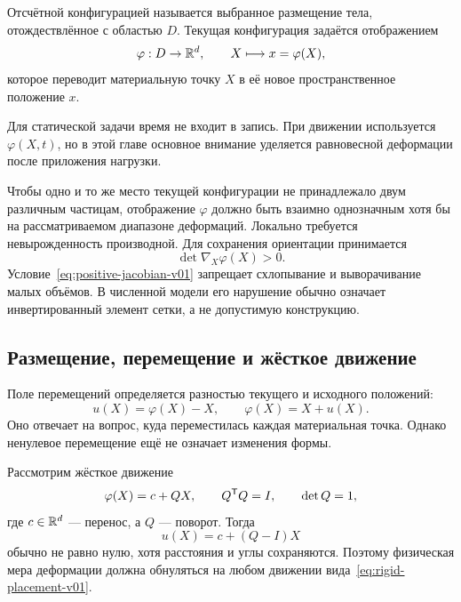 \begin{definition}
Отсчётной конфигурацией называется выбранное размещение тела, отождествлённое с областью $D$. Текущая конфигурация задаётся отображением
\begin{equation}
\label{eq:placement-v01}
\varphi:D\to\mathbb{R}^d,
\qquad
X\longmapsto x=\varphi(X),
\end{equation}
которое переводит материальную точку $X$ в её новое пространственное положение $x$.
\end{definition}

Для статической задачи время не входит в запись. При движении используется $\varphi(X,t)$, но в этой главе основное внимание уделяется равновесной деформации после приложения нагрузки.

Чтобы одно и то же место текущей конфигурации не принадлежало двум различным частицам, отображение $\varphi$ должно быть взаимно однозначным хотя бы на рассматриваемом диапазоне деформаций. Локально требуется невырожденность производной. Для сохранения ориентации принимается
\begin{equation}
\label{eq:positive-jacobian-v01}
\det \nabla_X\varphi(X)>0.
\end{equation}
Условие~\eqref{eq:positive-jacobian-v01} запрещает схлопывание и выворачивание малых объёмов. В численной модели его нарушение обычно означает инвертированный элемент сетки, а не допустимую конструкцию.

\subsection{Размещение, перемещение и жёсткое движение}

Поле перемещений определяется разностью текущего и исходного положений:
\begin{equation}
\label{eq:displacement-v01}
u(X)=\varphi(X)-X,
\qquad
\varphi(X)=X+u(X).
\end{equation}
Оно отвечает на вопрос, куда переместилась каждая материальная точка. Однако ненулевое перемещение ещё не означает изменения формы.

Рассмотрим жёсткое движение
\begin{equation}
\label{eq:rigid-placement-v01}
\varphi(X)=c+QX,
\qquad
Q^{\mathsf{T}}Q=I,
\qquad
\det Q=1,
\end{equation}
где $c\in\mathbb{R}^d$ --- перенос, а $Q$ --- поворот. Тогда
\[
u(X)=c+(Q-I)X
\]
обычно не равно нулю, хотя расстояния и углы сохраняются. Поэтому физическая мера деформации должна обнуляться на любом движении вида~\eqref{eq:rigid-placement-v01}.

